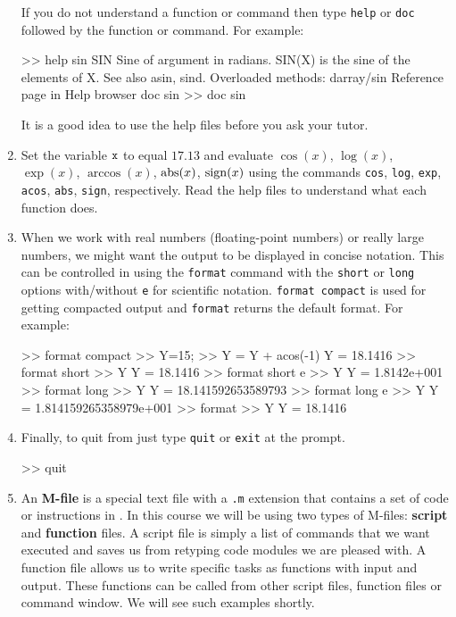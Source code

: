 \begin{labwork}
\begin{enumerate}
{If you do not understand a \Matlab function or command then type {\tt help} or {\tt doc} followed by the function or command. For example:
\begin{VrbM}
>> help sin
 SIN    Sine of argument in radians.
    SIN(X) is the sine of the elements of X.
    See also asin, sind.
    Overloaded methods:
       darray/sin
    Reference page in Help browser
       doc sin
>> doc sin
\end{VrbM}
It is a good idea to use the help files before you ask your tutor.
}
\item{
Set the variable ${\tt x}$ to equal $17.13$ and evaluate $\cos(x)$, $\log(x)$, $\exp(x)$, $\arccos(x)$, $\operatorname{abs}(x)$, $\operatorname{sign}(x)$ using the \Matlab commands {\tt cos}, {\tt log}, {\tt exp}, {\tt acos}, {\tt abs}, {\tt sign}, respectively.  Read the help files to understand what each function does.
}
\item{
When we work with real numbers (floating-point numbers) or really large numbers, we might want the output to be displayed in concise notation.  This can be controlled in \Matlab using the {\tt format} command with the {\tt short} or {\tt long} options with/without {\tt e} for scientific notation. {\tt format compact} is used for getting compacted output and {\tt format} returns the default format.  For example:
\begin{VrbM}
>> format compact
>> Y=15;
>> Y = Y + acos(-1)
Y =   18.1416
>> format short
>> Y
Y =   18.1416
>> format short e
>> Y
Y =  1.8142e+001
>> format long
>> Y
Y =  18.141592653589793
>> format long e
>> Y
Y =    1.814159265358979e+001
>> format
>> Y
Y =   18.1416
\end{VrbM}
}
\item{
Finally, to quit from \Matlab just type {\tt quit} or {\tt exit} at the prompt.
\begin{VrbM}
>> quit
\end{VrbM}
}
\item{
An {\bf M-file} is a special text file with a {\tt .m} extension that contains a set of code or instructions in \Matlab.  In this course we will be using two types of M-files: {\bf script} and {\bf function} files.  A script file is simply a list of  commands that we want executed and saves us from retyping code modules we are pleased with.  A function file allows us to write specific tasks as functions with input and output.  These functions can be called from other script files, function files or command window.  We will see such examples shortly.
}
\end{enumerate}

\end{labwork}

